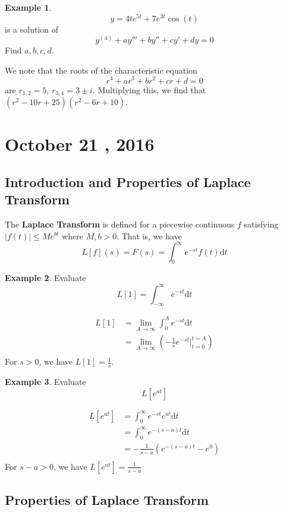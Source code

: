 \documentclass[11pt]{article}
\theoremstyle{plain} %
\theoremstyle{definition}
\theoremstyle{example}
\newtheorem*{example}{Example}
\theoremstyle{remark}
\begin{document}
\begin{example}
$$y = 4te^{5t} + 7e^{3t}\cos(t)$$ is a solution of $$y^{(4)} + ay''' + by'' + cy' + dy = 0$$ Find $a, b, c, d$.
\end{example}

We note that the roots of the characteristic equation $$r^4 + ar^3 + br^2 + cr + d = 0$$ are $r_{1,2} = 5$, $r_{3,4} = 3 \pm i$. Multiplying this, we find that $\left(r^2-10r+25\right)\left(r^2-6r+10\right)$.

\section{October 21 , 2016}

\subsection{Introduction and Properties of Laplace Transform}

The \textbf{Laplace Transform} is defined for a piecewise continuous $f$ satisfying $|f(t)| \leq Me^{bt}$ where $M, b > 0$. That is, we have $$L[f](s) = F(s) = \int_{0}^{\infty} e^{-st}f(t) \mathrm d t $$


\begin{example}
Evaluate $$L[1] = \int_{-\infty}^{\infty}  e^{-st} \mathrm d t$$
\end{example}

\begin{align*}
	L[1] &= \lim_{A \to \infty} \int_0^Ae^{-st} \mathrm d t \\
	&= \lim_{A \to \infty} \left(-\frac{1}{s}e^{-st}|_{t=0}^{t=A}\right) \\
\end{align*}
For $s>0$, we have $L[1] = \frac{1}{s}$.

\begin{example}
Evaluate $$L[e^{at}]$$
\end{example}

\begin{align*}
L[e^{at}] &= \int_0^{\infty}e^{-st}e^{at} \mathrm d t\\
&= \int_0^{\infty} e^{-(s-a)t} \mathrm d t \\
&= -\frac{1}{s-a} \left(e^{-(s-a)t} -e^0 \right) \\
\end{align*}
For $s-a > 0$, we have $L[e^{at}] = \frac{1}{s-a}$


\subsection{Properties of Laplace Transform}
\end{document}
